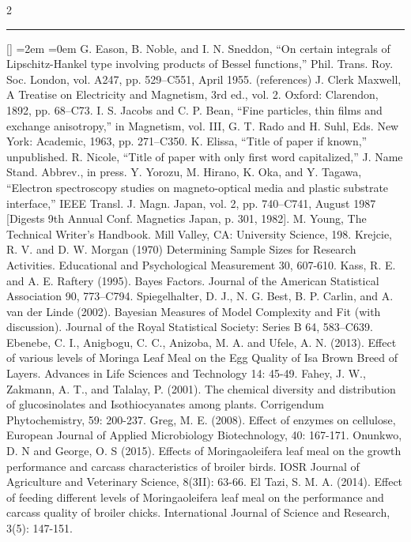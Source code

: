\documentclass{book}
\theoremstyle{remark}
\begin{document}
\begin{multicols}{2}
%
%
\parskip=5pt
\noindent \rule[0pt]{25em}{1pt}

\parskip=10pt
\vspace{-6pt}
\begin{list}{[]}{ %
\leftmargin=2em%
=0em%
\renewcommand{\makelabel}[1]{#1 \hfil}}%
 G. Eason, B. Noble, and I. N. Sneddon, ``On certain integrals of Lipschitz-Hankel type involving products of Bessel functions,'' Phil. Trans. Roy. Soc. London, vol. A247, pp. 529--C551, April 1955. (references)
 J. Clerk Maxwell, A Treatise on Electricity and Magnetism, 3rd ed., vol. 2. Oxford: Clarendon, 1892, pp. 68--C73.
 I. S. Jacobs and C. P. Bean, ``Fine particles, thin films and exchange anisotropy,'' in Magnetism, vol. III, G. T. Rado and H. Suhl, Eds. New York: Academic, 1963, pp. 271--C350.
 K. Elissa, ``Title of paper if known,'' unpublished.
 R. Nicole, ``Title of paper with only first word capitalized,'' J. Name Stand. Abbrev., in press.
 Y. Yorozu, M. Hirano, K. Oka, and Y. Tagawa, ``Electron spectroscopy studies on magneto-optical media and plastic substrate interface,'' IEEE Transl. J. Magn. Japan, vol. 2, pp. 740--C741, August 1987 [Digests 9th Annual Conf. Magnetics Japan, p. 301, 1982].
 M. Young, The Technical Writer's Handbook. Mill Valley, CA: University Science, 198.
 Krejcie, R. V. and D. W. Morgan (1970) Determining Sample Sizes for Research Activities. Educational and Psychological Measurement 30, 607-610.
 Kass, R. E. and A. E. Raftery (1995). Bayes Factors. Journal of the American Statistical Association 90, 773--C794.
 Spiegelhalter, D. J., N. G. Best, B. P. Carlin, and A. van der Linde (2002). Bayesian Measures of Model Complexity and Fit (with discussion). Journal of the Royal Statistical Society: Series B 64, 583--C639.
 Ebenebe, C. I., Anigbogu, C. C., Anizoba, M. A. and Ufele, A. N. (2013). Effect of various levels of Moringa Leaf Meal on the Egg Quality of Isa Brown Breed of Layers. Advances in Life Sciences and Technology 14: 45-49.
 Fahey, J. W., Zakmann, A. T., and Talalay, P. (2001). The chemical diversity and distribution of glucosinolates and Isothiocyanates among plants. Corrigendum Phytochemistry, 59: 200-237.
 Greg, M. E. (2008). Effect of enzymes on cellulose, European Journal of Applied Microbiology Biotechnology, 40: 167-171.
 Onunkwo, D. N and George, O. S (2015). Effects of Moringaoleifera leaf meal on the growth performance and carcass characteristics of broiler birds. IOSR Journal of Agriculture and Veterinary Science, 8(3II): 63-66.
 El Tazi, S. M. A. (2014). Effect of feeding different levels of Moringaoleifera leaf meal on the performance and carcass quality of broiler chicks. International Journal of Science and Research, 3(5): 147-151.
\end{list}

\end{multicols}
\end{document}
